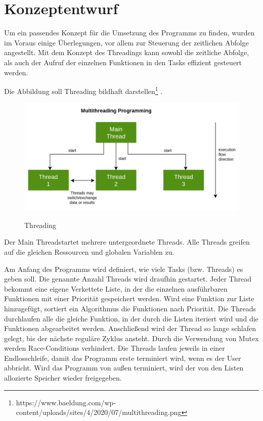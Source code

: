 \chapter{Konzeptentwurf}
\label{cha:Konzeptentwurf}

Um ein passendes Konzept für die Umsetzung des Programms zu finden, wurden im Voraus einige Überlegungen, vor allem zur Steuerung der zeitlichen Abfolge angestellt.
Mit dem Konzept des Threadings kann sowohl die zeitliche Abfolge, als auch der Aufruf der einzelnen Funktionen in den Tasks effizient gesteuert werden. 

Die Abbildung  soll Threading bildhaft darstellen\footnote[1]{https://www.baeldung.com/wp-content/uploads/sites/4/2020/07/multithreading.png}	.

\begin{figure}[hbt]				%
	\centering						%
	\includegraphics[width=0.6\linewidth]{images/multithreading}	
	\label{fig:multithreading}
	\caption{Threading}
	{\raggedright
	 }
	
\end{figure}

Der \glqq Main Thread\grqq \space startet mehrere untergeordnete Threads. Alle Threads greifen auf die gleichen Ressourcen und globalen Variablen zu. 

Am Anfang des Programms wird definiert, wie viele Tasks (bzw. Threads) es geben soll. Die genannte Anzahl Threads wird draufhin gestartet. Jeder Thread bekommt eine eigene Verkettete Liste, in der die einzelnen ausführbaren Funktionen mit einer Priorität gespeichert werden. Wird eine Funktion zur Liste hinzugefügt, sortiert ein Algorithmus die Funktionen nach Priorität. 
Die Threads durchlaufen alle die gleiche Funktion, in der durch die Listen iteriert wird und die Funktionen abgearbeitet werden. Anschließend wird der Thread so lange schlafen gelegt, bis der nächste reguläre Zyklus ansteht. 
Durch die Verwendung von Mutex werden Race-Conditions verhindert.
Die Threads laufen jeweils in einer Endlosschleife, damit das Programm erste terminiert wird, wenn es der User abbricht. 
Wird das Programm von außen terminiert, wird der von den Listen allozierte Speicher wieder freigegeben. 